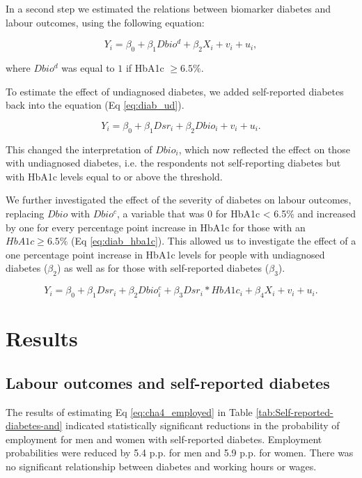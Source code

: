 \documentclass[12pt,english]{article}
\begin{document}
In a second step we estimated the relations between biomarker diabetes and labour outcomes, using the following equation:

\begin{equation}
Y_{i}=\beta_{0}+\beta_{1}Dbio^{d}+\beta_{2}X_{i}+v_{i}+u_{i}\label{eq:diab},
\end{equation}

where $Dbio^{d}$ was equal to $1$ if \ac{HbA1c} $\geq 6.5\%$.

To estimate the effect of undiagnosed diabetes, we added self-reported diabetes back into the equation (Eq \ref{eq:diab_ud}).

\begin{equation}
Y_{i}=\beta_{0}+\beta_{1}Dsr_{i}+\beta_{2}Dbio_{i}+v_{i}+u_{i}.\label{eq:diab_ud}
\end{equation}

This changed the interpretation of $Dbio_{i}$, which now reflected the effect on those with undiagnosed diabetes, i.e. the respondents not self-reporting diabetes but with \ac{HbA1c} levels equal to or above the threshold. 

We further investigated the effect of the severity of diabetes on labour outcomes, replacing $Dbio$ with $Dbio^{c}$, a variable that was $0$ for \ac{HbA1c} < 6.5\% and increased by one for every percentage point increase in \ac{HbA1c} for those with an $HbA1c \geq 6.5\%$ (Eq \ref{eq:diab_hba1c}). This allowed us to investigate the effect of a one percentage point increase in \ac{HbA1c} levels for people with undiagnosed diabetes ($\beta_{2}$) as well as for those with self-reported diabetes ($\beta_{3}$).

\begin{equation}
Y_{i}=\beta_{0}+\beta_{1}Dsr_{i}+\beta_{2}Dbio^{c}_{i}+\beta_{3}Dsr_{i}*HbA1c_{i}+\beta_{4}X_{i}+v_{i}+u_{i}.\label{eq:diab_hba1c}
\end{equation}

\section{\label{sec:cha_4_results}Results}


\subsection{Labour outcomes and self-reported diabetes}

The results of estimating Eq \ref{eq:cha4_employed} in Table \ref{tab:Self-reported-diabetes-and} indicated statistically significant reductions in the probability of employment for men and women with self-reported diabetes. Employment probabilities were reduced by 5.4 \ac{p.p.} for men and 5.9 \ac{p.p.} for women. There was no significant relationship between diabetes and working hours or wages. 
\end{document}
